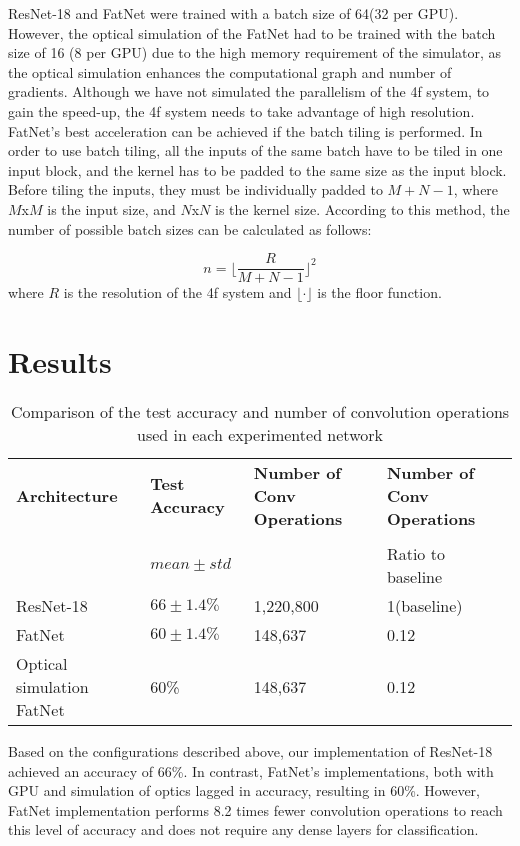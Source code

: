 \documentclass{article}
\begin{document}
ResNet-18 and FatNet were trained with a batch size of 64(32 per GPU). However, the optical simulation of the FatNet had to be trained with the batch size of 16 (8 per GPU) due to the high memory requirement of the simulator, as the optical simulation enhances the computational graph and number of gradients. Although we have not simulated the parallelism of the 4f system, to gain the speed-up, the 4f system needs to take advantage of high resolution. FatNet's best acceleration can be achieved if the batch tiling is performed. In order to use batch tiling, all the inputs of the same batch have to be tiled in one input block, and the kernel has to be padded to the same size as the input block. Before tiling the inputs, they must be individually padded to $M+N-1$, where $M$x$M$ is the input size, and $N$x$N$ is the kernel size. According to this method, the number of possible batch sizes can be calculated as follows: 

\begin{equation}
    n = \lfloor\frac{R}{M+N-1}\rfloor^2
\end{equation}
where $R$ is the resolution of the 4f system and $\lfloor \cdot \rfloor$ is the floor function.

\section{Results}

\begin{table}[H]
\caption{ Comparison of the test accuracy and number of convolution operations used in each experimented network}
\begin{tabular}{llll}
\toprule
\textbf{Architecture}	& \textbf{Test Accuracy}	& \textbf{Number of Conv Operations} & \textbf{Number of Conv Operations}\\ \\
&  \small{$mean\pm std$} & & Ratio to baseline\\
\midrule
ResNet-18	                 	& $66 \pm 1.4\%	$		& 1,220,800      &  1(baseline)\\
FatNet	                     	& $60 \pm 1.4\%	$		& 148,637        &  0.12\\
Optical simulation FatNet		& 60\%			        & 148,637        &  0.12\\
\bottomrule
\end{tabular}
\label{tab1}
\end{table}
\unskip

Based on the configurations described above, our implementation of ResNet-18 achieved an accuracy of 66\%. In contrast, FatNet's implementations, both with GPU and simulation of optics lagged in accuracy, resulting in 60\%. However, FatNet implementation performs 8.2 times fewer convolution operations to reach this level of accuracy and does not require any dense layers for classification. 
\end{document}
